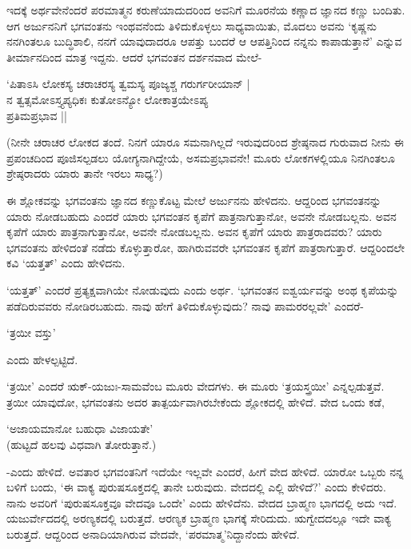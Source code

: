 ಇದಕ್ಕೆ ಅರ್ಥವೇನೆಂದರೆ ಪರಮಾತ್ಮನ ಕರುಣೆಯಾದುದರಿಂದ ಅವನಿಗೆ ಮೂರನೆಯ ಕಣ್ಣಾದ ಜ್ಞಾನದ ಕಣ್ಣು ಬಂದಿತು. ಆಗ ಅರ್ಜುನನಿಗೆ ಭಗವಂತನು ಇಂಥವನೆಂದು ತಿಳಿದುಕೊಳ್ಳಲು ಸಾಧ್ಯವಾಯಿತು, ಮೊದಲು ಅವನು `ಕೃಷ್ಣನು ನನಗಿಂತಲೂ ಬುದ್ಧಿಶಾಲಿ, ನನಗೆ ಯಾವುದಾದರೂ ಆಪತ್ತು ಬಂದರೆ ಆ ಆಪತ್ತಿನಿಂದ ನನ್ನನು ಕಾಪಾಡುತ್ತಾನೆ' ಎನ್ನುವ ತೀರ್ಮಾನದಿಂದ ಮಾತ್ರ ಇದ್ದನು. ಆದರೆ ಭಗವಂತನ ದರ್ಶನವಾದ ಮೇಲೆ-

\begin{shloka}
`ಪಿತಾಽಸಿ ಲೋಕಸ್ಯ ಚರಾಚರಸ್ಯ ತ್ವಮಸ್ಯ ಪೂಜ್ಯಶ್ಚ ಗರುರ್ಗರೀಯಾನ್ |\\
ನ ತ್ವತ್ಸಮೋಽಸ್ತ್ಯಪ್ಯಧಿಕಃ ಕುತೋಽನ್ಯೋ ಲೋಕಾತ್ರಯೇಽಪ್ಯ\\
\hspace{5.3cm} ಪ್ರತಿಮಪ್ರಭಾವ ||
\end{shloka}

(ನೀನೇ ಚರಾಚರ ಲೋಕದ ತಂದೆ. ನಿನಗೆ ಯಾರೂ ಸಮನಾಗಿಲ್ಲದೆ ಇರುವುದರಿಂದ ಶ್ರೇಷ್ಠನಾದ ಗುರುವಾದ ನೀನು ಈ ಪ್ರಪಂಚದಿಂದ ಪೂಜಿಸಲ್ಪಡಲು ಯೋಗ್ಯನಾಗಿದ್ದೇಯೆ, ಅಸಮಪ್ರಭಾವನೇ! ಮೂರು ಲೋಕಗಳಲ್ಲಿಯೂ ನಿನಗಿಂತಲೂ ಶ್ರೇಷ್ಠರಾದರು ಯಾರು ತಾನೇ ಇರಲು ಸಾಧ್ಯ?)

ಈ ಶ್ಲೋಕವನ್ನು ಭಗವಂತನು ಜ್ಞಾನದ ಕಣ್ಣುಕೊಟ್ಟ ಮೇಲೆ ಅರ್ಜುನನು ಹೇಳಿದನು. ಆದ್ದರಿಂದ ಭಗವಂತನನ್ನು ಯಾರು ನೋಡಬಹುದು ಎಂದರೆ ಯಾರು ಭಗವಂತನ ಕೃಪೆಗೆ ಪಾತ್ರನಾಗುತ್ತಾನೋ, ಅವನೇ ನೋಡಬಲ್ಲನು. ಅವನ ಕೃಪೆಗೆ ಯಾರು ಪಾತ್ರನಾಗುತ್ತಾನೋ, ಅವನೇ ನೋಡಬಲ್ಲನು. ಅವನ ಕೃಪೆಗೆ ಯಾರು ಪಾತ್ರರಾದವರು? ಯಾರು ಭಗವಂತನು ಹೇಳಿದಂತೆ ನಡೆದು ಕೊಳ್ಳುತ್ತಾರೋ, ಹಾಗಿರುವವರೇ ಭಗವಂತನ ಕೃಪೆಗೆ ಪಾತ್ರರಾಗುತ್ತಾರೆ. ಆದ್ದರಿಂದಲೇ ಕವಿ `ಯತ್ತತ್' ಎಂದು ಹೇಳಿದನು.

`ಯತ್ತತ್' ಎಂದರೆ ಪ್ರತ್ಯಕ್ಷವಾಗಿಯೇ ನೋಡುವುದು ಎಂದು ಅರ್ಥ. `ಭಗವಂತನ ಐಶ್ವರ್ಯವನ್ನು ಅಂಥ ಕೃಪೆಯನ್ನು ಪಡೆದಿರುವವರು ನೋಡಿರಬಹುದು. ನಾವು ಹೇಗೆ ತಿಳಿದುಕೊಳ್ಳುವುದು? ನಾವು ಪಾಮರರಲ್ಲವೇ' ಎಂದರೆ-

\begin{shloka}
`ತ್ರಯೀ ವಸ್ತು'
\end{shloka}

ಎಂದು ಹೇಳಲ್ಪಟ್ಟಿದೆ.

`ತ್ರಯೀ' ಎಂದರೆ ಋಕ್-ಯಜುಃ-ಸಾಮವೆಂಬ ಮೂರು ವೇದಗಳು. ಈ ಮೂರು `ತ್ರಯಸ್ತ್ರಯೀ' ಎನ್ನಲ್ಪಡುತ್ತವೆ. ತ್ರಯೀ ಯಾವುದೋ, ಭಗವಂತನು ಅದರ ತಾತ್ಪರ್ಯವಾಗಿರಬೇಕೆಂದು ಶ್ಲೋಕದಲ್ಲಿ ಹೇಳಿದೆ. ವೇದ ಒಂದು ಕಡೆ,

\begin{shloka}
`ಅಜಾಯಮಾನೋ ಬಹುಧಾ ವಿಜಾಯತೇ'\\
(ಹುಟ್ಟದೆ ಹಲವು ವಿಧವಾಗಿ ತೋರುತ್ತಾನೆ.)
\end{shloka}

-ಎಂದು ಹೇಳಿದೆ. ಅವತಾರ ಭಗವಂತನಿಗೆ ಇದೆಯೇ ಇಲ್ಲವೇ ಎಂದರೆ, ಹೀಗೆ ವೇದ ಹೇಳಿದೆ. ಯಾರೋ ಒಬ್ಬರು ನನ್ನ ಬಳಿಗೆ ಬಂದು, `ಈ ವಾಕ್ಯ ಪುರುಷಸೂಕ್ತದಲ್ಲಿ ತಾನೇ ಬರುವುದು. ವೇದದಲ್ಲಿ ಎಲ್ಲಿ ಹೇಳಿದೆ?' ಎಂದು ಕೇಳಿದರು. ನಾನು ಅವರಿಗೆ `ಪುರುಷಸೂಕ್ತವೂ ವೇದವೂ ಒಂದೇ' ಎಂದು ಹೇಳಿದೆನು. ವೇದದ ಬ್ರಾಹ್ಮಣ ಭಾಗದಲ್ಲಿ ಅದು ಇದೆ. ಯಜುರ್ವೇದದಲ್ಲಿ ಅರಣ್ಯಕದಲ್ಲಿ ಬರುತ್ತದೆ. ಆರಣ್ಯಕ ಬ್ರಾಹ್ಮಣ ಭಾಗಕ್ಕೆ ಸೇರಿದುದು. ಋಗ್ವೇದದಲ್ಲೂ ಇದೇ ವಾಕ್ಯ ಬರುತ್ತದೆ. ಆದ್ದರಿಂದ ಅನಾದಿಯಾಗಿರುವ ವೇದವೇ, `ಪರಮಾತ್ಮ'ನಿದ್ದಾನೆಂದು ಹೇಳಿದೆ.


